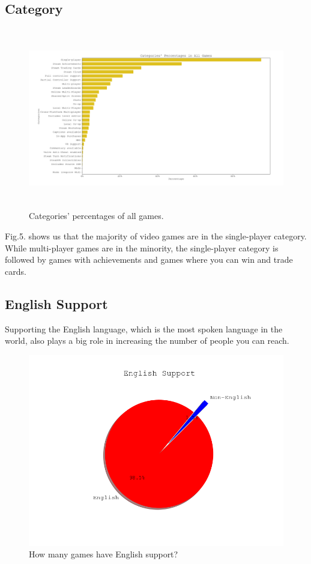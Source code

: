 \documentclass[conference]{IEEEtran}
\begin{document}
\subsection{Category}
\begin{figure}[h]
  \centering
  \includegraphics[width=\linewidth,height=7.9cm]{assets/categories_dist.png}
  \caption{Categories' percentages of all games.}
  \label{fig:category1}
\end{figure}

Fig.5. shows us that the majority of video games are in the single-player category. While multi-player games are in the minority, the single-player category is followed by games with achievements and games where you can win and trade cards.

\subsection{English Support}

Supporting the English language, which is the most spoken language in the world, also plays a big role in increasing the number of people you can reach. 

\begin{figure}[ht]
  \centering
  \includegraphics[width=\linewidth]{assets/english_support_pie.png}
  \caption{How many games have English support?}
  \label{fig:englishsupport1}
\end{figure}
\end{document}
